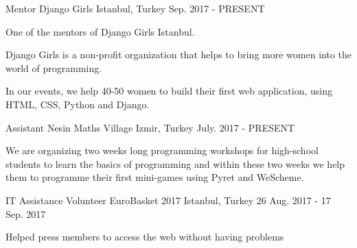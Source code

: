 


\begin{cventries}


\cventry
{Mentor} %
{Django Girls} %
{Istanbul, Turkey} %
{Sep. 2017 - PRESENT} %
{ %
\begin{cvitems}
\item {One of the mentors of Django Girls Istanbul.}
\item {Django Girls is a non-profit organization that helps to bring more women into the world of programming.}
\item {In our events, we help 40-50 women to build their first web application, using HTML, CSS, Python and Django.}
\end{cvitems}
}


\cventry
{Assistant} %
{Nesin Maths Village} %
{Izmir, Turkey} %
{July. 2017 - PRESENT} %
{ %
\begin{cvitems}
\item {We are organizing two weeks long programming workshops for high-school students to learn the basics of programming and within these two weeks we help them to programme their first mini-games using Pyret and WeScheme.}
\end{cvitems}
}


\cventry
{IT Assistance Volunteer} %
{EuroBasket 2017} %
{Istanbul, Turkey} %
{26 Aug. 2017 -  17 Sep. 2017} %
{ %
\begin{cvitems}
\item {Helped press members to access the web without having problems}
\end{cvitems} 
}


\end{cventries}